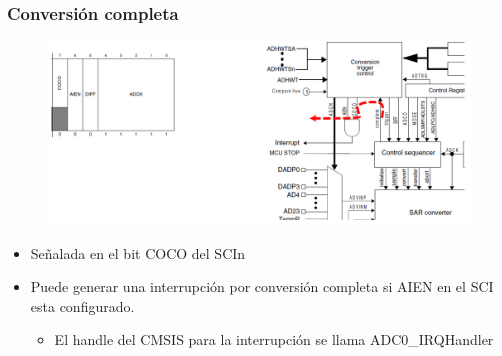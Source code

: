 \documentclass[10.5pt,scale=1.0,t,aspectratio=169,hyperref={pdfpagelabels=false}]{beamer}
\begin{document}
\begin{frame}
	\frametitle{Conversión completa}
	{\small
		\begin{figure}
			\centering
			\includegraphics[scale=0.25]{fig_CompleteConversion}
		\end{figure}
		\begin{itemize}
			\item Señalada en el bit COCO del SCIn
			\item Puede generar una interrupción por conversión completa si AIEN en el SCI esta configurado.
			\begin{itemize}
				\item El handle del CMSIS para la interrupción se llama ADC0\_IRQHandler
			\end{itemize}  
		\end{itemize}	
	}
\end{frame}
\end{document}
